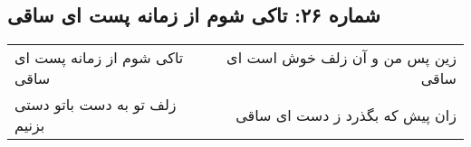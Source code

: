 \begin{center}
\section*{شماره ۲۶: تاکی شوم از زمانه پست ای ساقی}
\label{sec:026}
\begin{longtable}{l p{0.5cm} r}
تاکی شوم از زمانه پست ای ساقی
&&
زین پس من و آن زلف خوش است ای ساقی
\\
زلف تو به دست باتو دستی بزنیم
&&
زان پیش که بگذرد ز دست ای ساقی
\\
\end{longtable}
\end{center}
